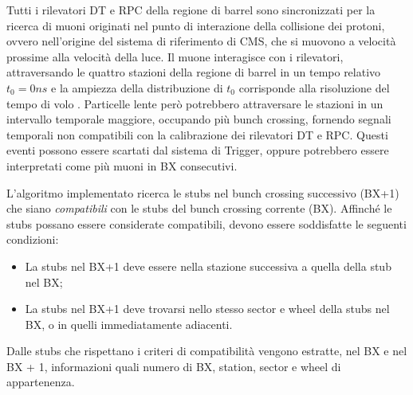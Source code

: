 Tutti i rilevatori DT e RPC della regione di barrel sono sincronizzati per la ricerca di muoni originati nel punto di interazione della collisione dei protoni, ovvero nell'origine del sistema di riferimento di CMS, che si muovono a velocità prossime alla velocità della luce. Il muone interagisce con i rilevatori, attraversando le quattro stazioni della regione di barrel in un tempo relativo $t_0 = 0 \si{ns}$ e la ampiezza della distribuzione di $t_0$ corrisponde alla risoluzione del tempo di volo \cite{MasterThesisGioMoc}. Particelle lente però potrebbero attraversare le stazioni in un intervallo temporale maggiore, occupando più bunch crossing, fornendo segnali temporali non compatibili con la calibrazione dei rilevatori DT e RPC. Questi eventi possono essere scartati dal sistema di Trigger, oppure potrebbero essere interpretati come più muoni in BX consecutivi.


\begin{figure}[t]
  \centering
  \centering
  \caption{}
  \label{fig:CMSLayout}
\end{figure}


L'algoritmo implementato ricerca le stubs nel bunch crossing successivo (BX+1) che siano \textit{compatibili} con le stubs del bunch crossing corrente (BX). Affinché le stubs possano essere considerate compatibili, devono essere soddisfatte le seguenti condizioni:

\begin{itemize}
  \item La stubs nel BX+1 deve essere nella stazione successiva a quella della stub nel BX;
  \item La stubs nel BX+1 deve trovarsi nello stesso sector e wheel della stubs nel BX, o in quelli immediatamente adiacenti.
\end{itemize}

Dalle stubs che rispettano i criteri di compatibilità vengono estratte, nel BX e nel BX + 1, informazioni quali numero di BX, station, sector e wheel di appartenenza.


